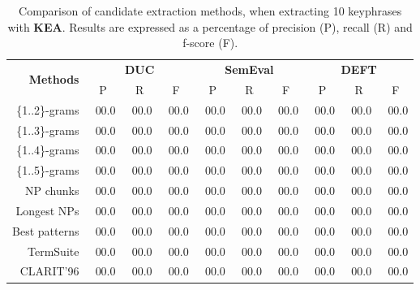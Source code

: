     \begin{table}[h]
      \centering
      \begin{tabular}{rccccccccc}
        \toprule
        \multirow{2}{*}[-2pt]{\textbf{Methods}} & \multicolumn{3}{c}{\textbf{DUC}} & \multicolumn{3}{c}{\textbf{SemEval}} & \multicolumn{3}{c}{\textbf{DEFT}}\\
        \cmidrule(r){2-4}\cmidrule(lr){5-7}\cmidrule(l){8-10}
        & P & R & F & P & R & F & P & R & F\\
        \midrule
        \{1..2\}-grams & ${~~}$00.0 & ${~~}$00.0 & ${~~}$00.0 & ${~~}$00.0 & ${~~}$00.0 & ${~~}$00.0 & ${~~}$00.0 & ${~~}$00.0 & ${~~}$00.0\\
        \{1..3\}-grams & ${~~}$00.0 & ${~~}$00.0 & ${~~}$00.0 & ${~~}$00.0 & ${~~}$00.0 & ${~~}$00.0 & ${~~}$00.0 & ${~~}$00.0 & ${~~}$00.0\\
        \{1..4\}-grams & ${~~}$00.0 & ${~~}$00.0 & ${~~}$00.0 & ${~~}$00.0 & ${~~}$00.0 & ${~~}$00.0 & ${~~}$00.0 & ${~~}$00.0 & ${~~}$00.0\\
        \{1..5\}-grams & ${~~}$00.0 & ${~~}$00.0 & ${~~}$00.0 & ${~~}$00.0 & ${~~}$00.0 & ${~~}$00.0 & ${~~}$00.0 & ${~~}$00.0 & ${~~}$00.0\\
        NP chunks & ${~~}$00.0 & ${~~}$00.0 & ${~~}$00.0 & ${~~}$00.0 & ${~~}$00.0 & ${~~}$00.0 & ${~~}$00.0 & ${~~}$00.0 & ${~~}$00.0\\
        Longest NPs & ${~~}$00.0 & ${~~}$00.0 & ${~~}$00.0 & ${~~}$00.0 & ${~~}$00.0 & ${~~}$00.0 & ${~~}$00.0 & ${~~}$00.0 & ${~~}$00.0\\
        Best patterns & ${~~}$00.0 & ${~~}$00.0 & ${~~}$00.0 & ${~~}$00.0 & ${~~}$00.0 & ${~~}$00.0 & ${~~}$00.0 & ${~~}$00.0 & ${~~}$00.0\\
        TermSuite & ${~~}$00.0 & ${~~}$00.0 & ${~~}$00.0 & ${~~}$00.0 & ${~~}$00.0 & ${~~}$00.0 & ${~~}$00.0 & ${~~}$00.0 & ${~~}$00.0\\
        CLARIT'96 & ${~~}$00.0 & ${~~}$00.0 & ${~~}$00.0 & ${~~}$00.0 & ${~~}$00.0 & ${~~}$00.0 & ${~~}$00.0 & ${~~}$00.0 & ${~~}$00.0\\
        \bottomrule
      \end{tabular}
      \caption{Comparison of candidate extraction methods, when extracting 10
               keyphrases with \textbf{KEA}. Results are expressed as a
               percentage of precision (P), recall (R) and f-score (F).
               \label{tab:keyphrase_extraction_results}}
    \end{table}

